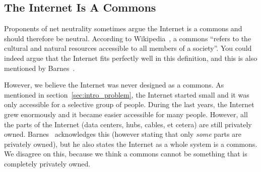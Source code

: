 \subsection{The Internet Is A Commons}
Proponents of net neutrality sometimes argue the Internet is a commons and should therefore be neutral.
According to Wikipedia~\cite{wikipedia2014commons}, a commons ``refers to the cultural and natural resources accessible to all members of a society''.
You could indeed argue that the Internet fits perfectly well in this definition, and this is also mentioned by Barnes~\cite{barnes2003capitalism}.

However, we believe the Internet was never designed as a commons.
As mentioned in section~\ref{sec:intro_problem}, the Internet started small and it was only accessible for a selective group of people.
During the last years, the Internet grew enormously and it became easier accessible for many people.
However, all the parts of the Internet (data centers, hubs, cables, et cetera) are still privately owned.
Barnes~\cite{barnes2003capitalism} acknowledges this (however stating that only \emph{some} parts are privately owned), but he also states the Internet as a whole system is a commons.
We disagree on this, because we think a commons cannot be something that is completely privately owned.